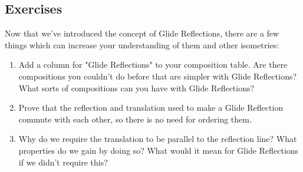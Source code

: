 \documentclass[11pt]{article}
\theoremstyle{definition}
\begin{document}
\subsection{Exercises}

Now that we've introduced the concept of Glide Reflections, there are a few
things which can increase your understanding of them and other isometries:
\begin{enumerate}
\item Add a column for "Glide Reflections" to your composition table. Are there
  compositions you couldn't do before that are simpler with Glide Reflections?
  What sorts of compositions can you have with Glide Reflections?
\item Prove that the reflection and translation used to make a Glide Reflection
  commute with each other, so there is no need for ordering them.
\item Why do we require the translation to be parallel to the reflection line?
  What properties do we gain by doing so? What would it mean for Glide
  Reflections if we didn't require this?
\end{enumerate}
\end{document}

